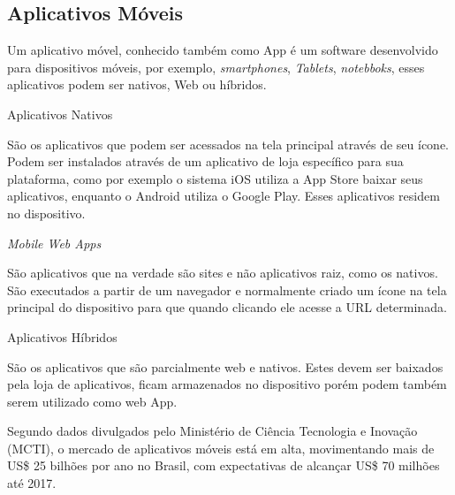 \subsection{Aplicativos Móveis}
Um aplicativo móvel, conhecido também como App é um software desenvolvido para dispositivos móveis, por exemplo, \textit{smartphones},  \textit{Tablets}, \textit{notebboks}, esses aplicativos podem ser nativos, Web ou híbridos. \cite{dif}

\begin{alineascomponto}

\item Aplicativos Nativos

São os aplicativos que podem ser acessados na tela principal através de seu ícone. Podem ser instalados através de um aplicativo de loja específico para sua plataforma, como por exemplo o sistema iOS utiliza a App Store baixar seus aplicativos, enquanto o Android utiliza o Google Play. Esses aplicativos residem no dispositivo.

\item \textit{Mobile Web Apps}

São aplicativos que na verdade são sites e não aplicativos raiz, como os nativos. São executados a partir de um navegador e normalmente criado um ícone na tela principal do dispositivo para que quando clicando ele acesse a URL determinada.

\item Aplicativos Híbridos

São os aplicativos que são parcialmente web e nativos.
Estes devem ser baixados pela loja de aplicativos, ficam armazenados no dispositivo porém podem também serem utilizado como web App.

	\end{alineascomponto} 
	
Segundo dados divulgados pelo Ministério de Ciência Tecnologia e Inovação (MCTI), o mercado de aplicativos móveis está em alta, movimentando mais de US\$ 25 bilhões por ano no Brasil, com expectativas de alcançar US\$ 70 milhões até 2017. \cite{mcti}
	
	

	
